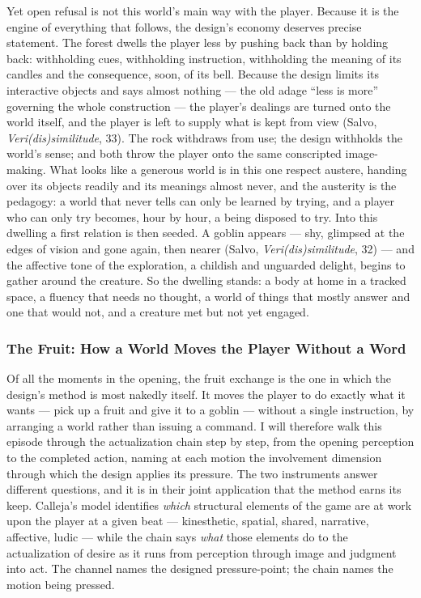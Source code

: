 Yet open refusal is not this world's main way with the player. Because it is the engine of everything that follows, the design's economy deserves precise statement. The forest dwells the player less by pushing back than by holding back: withholding cues, withholding instruction, withholding the meaning of its candles and the consequence, soon, of its bell. Because the design limits its interactive objects and says almost nothing — the old adage ``less is more'' governing the whole construction — the player's dealings are turned onto the world itself, and the player is left to supply what is kept from view (Salvo, \textit{Veri(dis)similitude}, 33). The rock withdraws from use; the design withholds the world's sense; and both throw the player onto the same conscripted image-making. What looks like a generous world is in this one respect austere, handing over its objects readily and its meanings almost never, and the austerity is the pedagogy: a world that never tells can only be learned by trying, and a player who can only try becomes, hour by hour, a being disposed to try. Into this dwelling a first relation is then seeded. A goblin appears — shy, glimpsed at the edges of vision and gone again, then nearer (Salvo, \textit{Veri(dis)similitude}, 32) — and the affective tone of the exploration, a childish and unguarded delight, begins to gather around the creature. So the dwelling stands: a body at home in a tracked space, a fluency that needs no thought, a world of things that mostly answer and one that would not, and a creature met but not yet engaged.

\subsubsection*{The Fruit: How a World Moves the Player Without a Word}

Of all the moments in the opening, the fruit exchange is the one in which the design's method is most nakedly itself. It moves the player to do exactly what it wants — pick up a fruit and give it to a goblin — without a single instruction, by arranging a world rather than issuing a command. I will therefore walk this episode through the actualization chain step by step, from the opening perception to the completed action, naming at each motion the involvement dimension through which the design applies its pressure. The two instruments answer different questions, and it is in their joint application that the method earns its keep. Calleja's model identifies \textit{which} structural elements of the game are at work upon the player at a given beat — kinesthetic, spatial, shared, narrative, affective, ludic — while the chain says \textit{what} those elements do to the actualization of desire as it runs from perception through image and judgment into act. The channel names the designed pressure-point; the chain names the motion being pressed.

